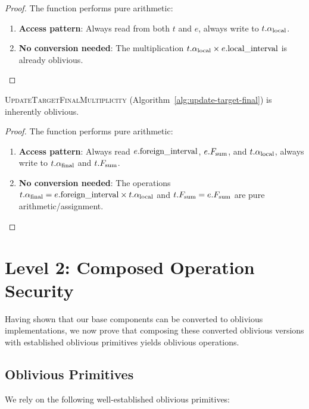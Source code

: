 \begin{proof}
The function performs pure arithmetic:
\begin{enumerate}
\item \textbf{Access pattern}: Always read from both $t$ and $e$, always write to $t.\alpha_{\text{local}}$.
\item \textbf{No conversion needed}: The multiplication $t.\alpha_{\text{local}} \times e.\text{local\_interval}$ is already oblivious.
\end{enumerate}
\end{proof}

\begin{lemma}
\label{lem:update-target-final}
\textsc{UpdateTargetFinalMultiplicity} (Algorithm~\ref{alg:update-target-final}) is inherently oblivious.
\end{lemma}

\begin{proof}
The function performs pure arithmetic:
\begin{enumerate}
\item \textbf{Access pattern}: Always read $e.\text{foreign\_interval}$, $e.F_{\text{sum}}$, and $t.\alpha_{\text{local}}$, always write to $t.\alpha_{\text{final}}$ and $t.F_{\text{sum}}$.
\item \textbf{No conversion needed}: The operations $t.\alpha_{\text{final}} = e.\text{foreign\_interval} \times t.\alpha_{\text{local}}$ and $t.F_{\text{sum}} = e.F_{\text{sum}}$ are pure arithmetic/assignment.
\end{enumerate}
\end{proof}

\section{Level 2: Composed Operation Security}

Having shown that our base components can be converted to oblivious implementations, we now prove that composing these converted oblivious versions with established oblivious primitives yields oblivious operations.

\subsection{Oblivious Primitives}

We rely on the following well-established oblivious primitives:

